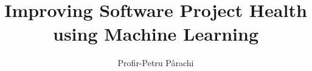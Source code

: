 
\title{Improving Software Project Health using Machine Learning}
\author{Profir-Petru P\^arachi}

\maketitle
\makedeclaration

